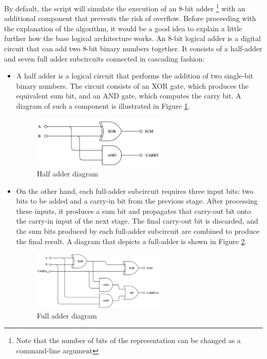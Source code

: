 \documentclass[12pt]{article}
\begin{document}
By default, the script will simulate the execution of an 8-bit adder \footnote{Note that the number of bits of the representation can be changed as a command-line argument} with an additional component that prevents the risk of overflow. Before proceeding with the explanation of the algorithm, it would be a good idea to explain a little further how the base logical architecture works.
An 8-bit logical adder is a digital circuit that can add two 8-bit binary numbers together. It consists of a half-adder and seven full adder subcircuits connected in cascading fashion:
\begin{itemize}
  \item A half adder is a logical circuit that performs the addition of two single-bit binary numbers. The circuit consists of an XOR gate, which produces the equivalent sum bit, and an AND gate, which computes the carry bit. A diagram of such a component is illustrated in Figure \ref{fig:halfadder}.

  \begin{figure}[h]
    \centering
    \includegraphics[width=0.6\textwidth]{halfadder.png}
    \caption{Half adder diagram}\label{fig:halfadder}
  \end{figure}
  
  \item On the other hand, each full-adder subcircuit requires three input bits: two bits to be added and a carry-in bit from the previous stage. After processing these inputs, it produces a sum bit and propagates that carry-out bit onto the carry-in input of the next stage. The final carry-out bit is discarded, and the sum bits produced by each full-adder subcircuit are combined to produce the final result. A diagram that depicts a full-adder is shown in Figure \ref{fig:fulladder}.

  \begin{figure}[h]
    \centering
    \includegraphics[width=0.6\textwidth]{fulladder.png}
    \caption{Full adder diagram}\label{fig:fulladder}
  \end{figure}
\end{itemize}
\end{document}
